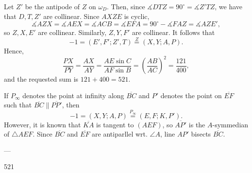 Let $Z'$ be the antipode of $Z$ on $\omega_D$. Then, since $\measuredangle DTZ=90^\circ=\measuredangle Z'TZ$, we have that $D,T,Z'$ are collinear. Since $AXZE$ is cyclic, \[\measuredangle AZX=\measuredangle AEX=\measuredangle ACB=\measuredangle EFA=90^\circ-\measuredangle FAZ=\measuredangle AZE',\]
so $Z,X,E'$ are collinear. Similarly, $Z,Y,F'$ are collinear. It follows that \[-1=(E',F';Z',T)\stackrel Z=(X,Y;A,P).\]
Hence, \[\frac{PX}{PY}=\frac{AX}{AY}=\frac{AE\sin C}{AF\sin B}=\left(\frac{AB}{AC}\right)^2=\frac{121}{400},\]
and the requested sum is $121+400=521$.

\begin{remark}
    If $P_\infty$ denotes the point at infinity along $\overline{BC}$ and $P'$ denotes the point on $\overline{EF}$ such that $\overline{BC}\parallel\overline{PP'}$, then \[-1=(X,Y;A,P)\stackrel{P_\infty}=(E,F;K,P').\]
    However, it is known that $\overline{KA}$ is tangent to $(AEF)$, so $\overline{AP'}$ is the $A$-symmedian of $\triangle AEF$. Since $\overline{BC}$ and $\overline{EF}$ are antiparllel wrt. $\angle A$, line $AP'$ bisects $\overline{BC}$.
\end{remark}

---

521
